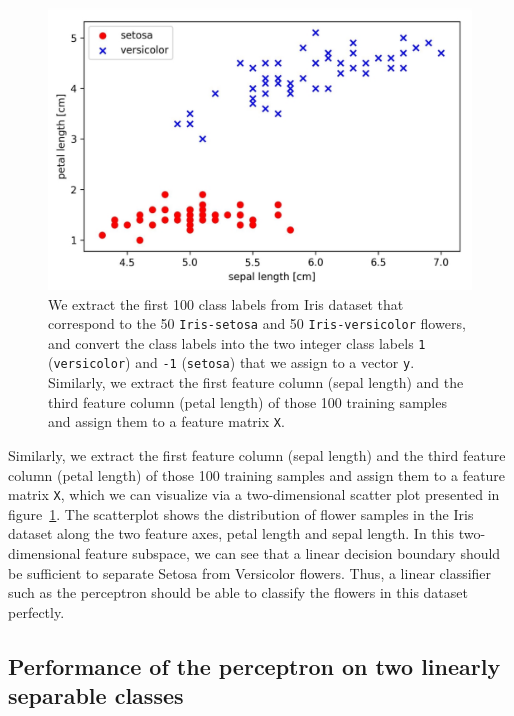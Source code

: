 \documentclass[11pt]{article}
\begin{document}
    \begin{figure}[hbt!]
        \centering
        \includegraphics[width=1\linewidth,trim=4 4 4 4,clip]{img/iris_2class.png}
        \caption{We extract the first 100 class labels from Iris dataset that correspond to the 50 \texttt{Iris-setosa} and 50 \texttt{Iris-versicolor} flowers, and convert the class labels into the two integer class labels \texttt{1} (\texttt{versicolor}) and \texttt{-1} (\texttt{setosa}) that we assign to a vector \texttt{y}.
        Similarly, we extract the first feature column (sepal length) and the third feature column (petal length) of those 100 training samples and assign them to a feature matrix \texttt{X}.}
        \label{fig:iris_2class}
    \end{figure}

    Similarly, we extract the first feature column (sepal length) and the third feature column (petal length) of those 100 training samples and assign them to a feature matrix \texttt{X}, which we can visualize via a two-dimensional scatter plot presented in figure~\ref{fig:iris_2class}.
    The scatterplot shows the distribution of flower samples in the Iris dataset along the two feature axes, petal length and sepal length.
    In this two-dimensional feature subspace, we can see that a linear decision boundary should be sufficient to separate Setosa from Versicolor flowers.
    Thus, a linear classifier such as the perceptron should be able to classify the flowers in this dataset perfectly.

    \subsection{Performance of the perceptron on two linearly separable classes} \label{subsec:perc_perf_2class}
\end{document}
